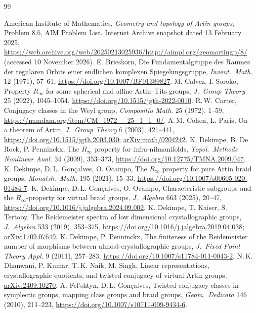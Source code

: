 \documentclass[11pt]{article}
\theoremstyle{definition}
\begin{document}
\begin{thebibliography}{99}
\raggedright
{} American Institute of Mathematics, \emph{Geometry and topology of Artin groups},
Problem 8.6, AIM Problem List. Internet Archive snapshot dated 13 February 2025,
\url{https://web.archive.org/web/20250213025936/http://aimpl.org/geomartingp/8/}
(accessed 10 November 2026).
 E. Brieskorn, Die Fundamentalgruppe des Raumes der regul\"aren Orbits einer endlichen komplexen Spiegelungsgruppe, \emph{Invent.\ Math.} 12 (1971), 57--61, \url{https://doi.org/10.1007/BF01389827}.
 M. Calvez, I. Soroko, Property $R_\infty$ for some spherical and affine Artin--Tits groups, \emph{J.\ Group Theory} 25 (2022), 1045--1054, \url{https://doi.org/10.1515/jgth-2022-0010}.
 R.\,W. Carter, Conjugacy classes in the Weyl group, \emph{Compositio Math.} 25 (1972), 1--59, \url{https://numdam.org/item/CM_1972__25_1_1_0/}.
 A.\,M. Cohen, L. Paris, On a theorem of Artin, \emph{J.\ Group Theory} 6 (2003), 421--441, \url{https://doi.org/10.1515/jgth.2003.030}; \href{https://arxiv.org/abs/math/0204242}{arXiv:math/0204242}.
 K. Dekimpe, B. De Rock, P. Penninckx, The $R_\infty$ property for infra-nilmanifolds, \emph{Topol.\ Methods Nonlinear Anal.} 34 (2009), 353--373, \url{https://doi.org/10.12775/TMNA.2009.047}.
 K. Dekimpe, D.\,L. Gon\c{c}alves, O. Ocampo, The $R_\infty$ property for pure Artin braid groups, \emph{Monatsh.\ Math.} 195 (2021), 15--33, \url{https://doi.org/10.1007/s00605-020-01484-7}.
 K. Dekimpe, D.\,L. Gon\c{c}alves, O. Ocampo, Characteristic subgroups and the $R_\infty$-property for virtual braid groups, \emph{J.\ Algebra} 663 (2025), 20--47, \url{https://doi.org/10.1016/j.jalgebra.2024.09.002}.
 K. Dekimpe, T. Kaiser, S. Tertooy, The Reidemeister spectra of low dimensional crystallographic groups, \emph{J.\ Algebra} 533 (2019), 353--375, \url{https://doi.org/10.1016/j.jalgebra.2019.04.038}; \href{https://arxiv.org/abs/1709.07649}{arXiv:1709.07649}.
 K. Dekimpe, P. Penninckx, The finiteness of the Reidemeister number of morphisms between almost-crystallographic groups, \emph{J.\ Fixed Point Theory Appl.} 9 (2011), 257--283, \url{https://doi.org/10.1007/s11784-011-0043-2}.
 N.\,K. Dhanwani, P. Kumar, T.\,K. Naik, M. Singh, Linear representations, crystallographic quotients, and twisted conjugacy of virtual Artin groups, \href{https://arxiv.org/abs/2409.10270}{arXiv:2409.10270}.
 A. Fel'shtyn, D.\,L. Gon\c{c}alves, Twisted conjugacy classes in symplectic groups, mapping class groups and braid groups, \emph{Geom.\ Dedicata} 146 (2010), 211--223, \url{https://doi.org/10.1007/s10711-009-9434-6}.

\end{thebibliography}
\end{document}
